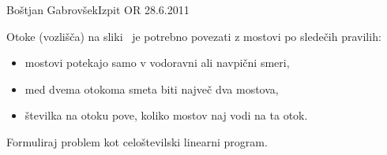 \begin{naloga}{Boštjan Gabrovšek}{Izpit OR 28.6.2011}
\begin{vprasanje}
Otoke (vozlišča) na sliki~\fig
je potrebno povezati z mostovi po sledečih pravilih:
\begin{itemize}
\item mostovi potekajo samo v vodoravni ali navpični smeri,
\item med dvema otokoma smeta biti največ dva mostova,
\item številka na otoku pove, koliko mostov naj vodi na ta otok.
\end{itemize}
Formuliraj problem kot celoštevilski linearni program.

\begin{slika}
\pgfslika
{}
\end{slika}
\end{vprasanje}
\begin{odgovor}
\end{odgovor}
\end{naloga}
